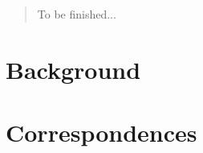 \documentclass[12pt,a4paper,fleqn]{article}
\theoremstyle{definition}
\theoremstyle{plain}
\theoremstyle{plain}
\theoremstyle{definition}
\begin{document}
\renewcommand{\abstractname}{Acknowledgements}
\begin{abstract}
To be finished...
\end{abstract}

\newpage
\tableofcontents



\newpage
\section{Background}




\newpage
\section{Correspondences}







\newpage


\nocite{*}
\end{document}
